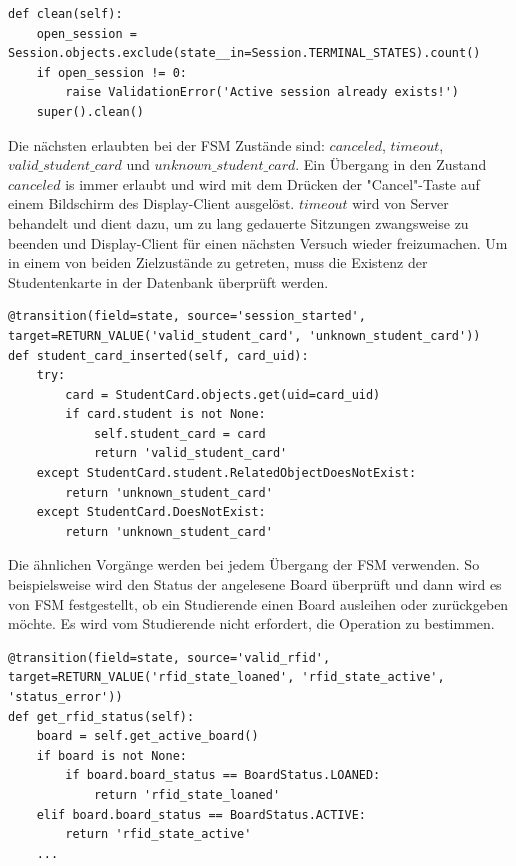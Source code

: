 \begin{lstlisting}[caption={Session clean() für die Validation des Modells},captionpos=b]
def clean(self):
	open_session = Session.objects.exclude(state__in=Session.TERMINAL_STATES).count()
	if open_session != 0:
		raise ValidationError('Active session already exists!')
	super().clean()
\end{lstlisting}

Die nächsten erlaubten bei der FSM Zustände sind: $canceled$, $timeout$, $valid\_student\_card$ und $unknown\_student\_card$. Ein Übergang in den Zustand $canceled$ is immer erlaubt und wird mit dem Drücken der "Cancel"-Taste auf einem Bildschirm des Display-Client ausgelöst. $timeout$ wird von Server behandelt und dient dazu, um zu lang gedauerte Sitzungen zwangsweise zu beenden und Display-Client für einen nächsten Versuch wieder freizumachen. Um in einem von beiden Zielzustände zu getreten, muss die Existenz der Studentenkarte in der Datenbank überprüft werden. 
\begin{lstlisting}[caption={FSM Übergang beim Ablesen der Studentenkarte},captionpos=b]
@transition(field=state, source='session_started', target=RETURN_VALUE('valid_student_card', 'unknown_student_card'))
def student_card_inserted(self, card_uid):
	try:
		card = StudentCard.objects.get(uid=card_uid)
		if card.student is not None:
			self.student_card = card
			return 'valid_student_card'
	except StudentCard.student.RelatedObjectDoesNotExist:
		return 'unknown_student_card'
	except StudentCard.DoesNotExist:
		return 'unknown_student_card'
\end{lstlisting}

Die ähnlichen Vorgänge werden bei jedem Übergang der FSM verwenden. So beispielsweise wird den Status der angelesene Board überprüft und dann wird es von FSM festgestellt, ob ein Studierende einen Board ausleihen oder zurückgeben möchte. Es wird vom Studierende nicht erfordert, die Operation zu bestimmen. 

\begin{lstlisting}[caption={FSM Übergang beim Ablesen der Board RFID-Tag},captionpos=b]
@transition(field=state, source='valid_rfid',
target=RETURN_VALUE('rfid_state_loaned', 'rfid_state_active', 'status_error'))
def get_rfid_status(self):
	board = self.get_active_board()
	if board is not None:
		if board.board_status == BoardStatus.LOANED:
			return 'rfid_state_loaned'
	elif board.board_status == BoardStatus.ACTIVE:
		return 'rfid_state_active'
	...
\end{lstlisting}

